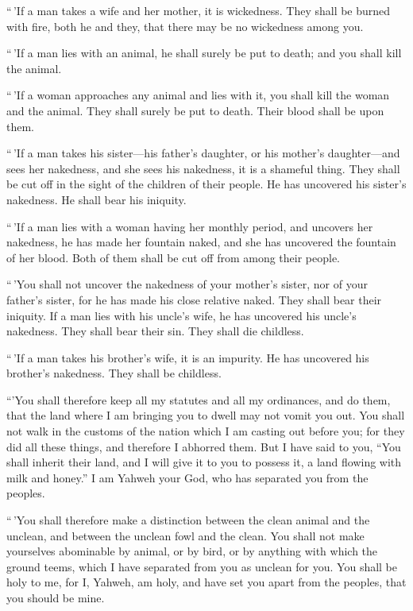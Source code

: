  ``\,'If a man takes a wife and her mother, it is
wickedness. They shall be burned with fire, both he and they, that there
may be no wickedness among you.

 ``\,'If a man lies with an animal, he shall surely be
put to death; and you shall kill the animal.

 ``\,'If a woman approaches any animal and lies with it,
you shall kill the woman and the animal. They shall surely be put to
death. Their blood shall be upon them.

 ``\,'If a man takes his sister---his father's daughter,
or his mother's daughter---and sees her nakedness, and she sees his
nakedness, it is a shameful thing. They shall be cut off in the sight of
the children of their people. He has uncovered his sister's nakedness.
He shall bear his iniquity.

 ``\,'If a man lies with a woman having her monthly
period, and uncovers her nakedness, he has made her fountain naked, and
she has uncovered the fountain of her blood. Both of them shall be cut
off from among their people.

 ``\,'You shall not uncover the nakedness of your
mother's sister, nor of your father's sister, for he has made his close
relative naked. They shall bear their iniquity.  If a man
lies with his uncle's wife, he has uncovered his uncle's nakedness. They
shall bear their sin. They shall die childless.

 ``\,'If a man takes his brother's wife, it is an
impurity. He has uncovered his brother's nakedness. They shall be
childless.

 ``'You shall therefore keep all my statutes and all my
ordinances, and do them, that the land where I am bringing you to dwell
may not vomit you out.  You shall not walk in the customs
of the nation which I am casting out before you; for they did all these
things, and therefore I abhorred them.  But I have said
to you, ``You shall inherit their land, and I will give it to you to
possess it, a land flowing with milk and honey.'' I am Yahweh your God,
who has separated you from the peoples.

 ``\,'You shall therefore make a distinction between the
clean animal and the unclean, and between the unclean fowl and the
clean. You shall not make yourselves abominable by animal, or by bird,
or by anything with which the ground teems, which I have separated from
you as unclean for you.  You shall be holy to me, for I,
Yahweh, am holy, and have set you apart from the peoples, that you
should be mine.

